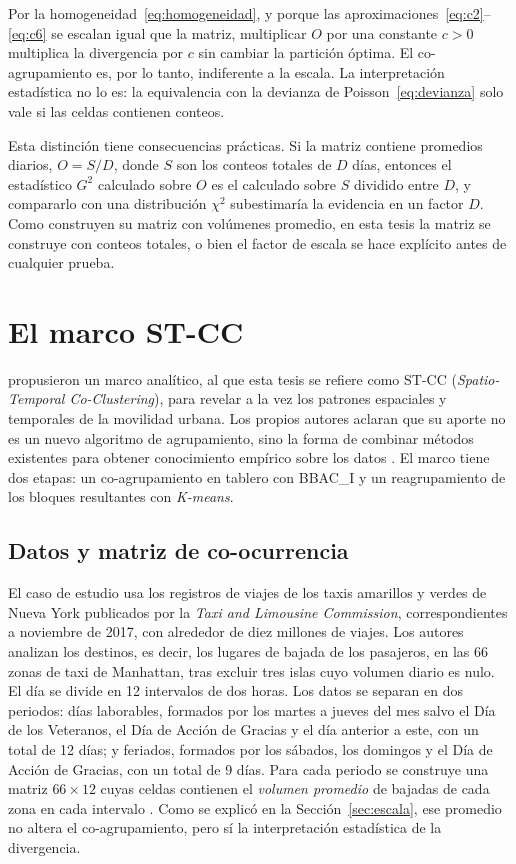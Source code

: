 Por la homogeneidad~\eqref{eq:homogeneidad}, y porque las
aproximaciones~\eqref{eq:c2}--\eqref{eq:c6} se escalan igual que la matriz,
multiplicar $O$ por una constante $c > 0$ multiplica la divergencia por $c$ sin
cambiar la partición óptima. El co-agrupamiento es, por lo tanto, indiferente a la
escala. La interpretación estadística no lo es: la equivalencia con la devianza
de Poisson~\eqref{eq:devianza} solo vale si las celdas contienen conteos.

Esta distinción tiene consecuencias prácticas. Si la matriz contiene promedios
diarios, $O = S / D$, donde $S$ son los conteos totales de $D$ días, entonces el
estadístico $G^2$ calculado sobre $O$ es el calculado sobre $S$ dividido entre
$D$, y compararlo con una distribución $\chi^2$ subestimaría la evidencia en un
factor $D$. Como \cite{Liu2021} construyen su matriz con volúmenes promedio, en
esta tesis la matriz se construye con conteos totales, o bien el factor de escala
se hace explícito antes de cualquier prueba.

\section{El marco ST-CC}\label{sec:stcc}

\cite{Liu2021} propusieron un marco analítico, al que esta tesis se refiere como
ST-CC (\emph{Spatio-Temporal Co-Clustering}), para revelar a la vez los patrones
espaciales y temporales de la movilidad urbana. Los propios autores aclaran que su
aporte no es un nuevo algoritmo de agrupamiento, sino la forma de combinar métodos
existentes para obtener conocimiento empírico sobre los datos
\cite[Sec.~I]{Liu2021}. El marco tiene dos etapas: un co-agrupamiento en tablero
con BBAC\_I y un reagrupamiento de los bloques resultantes con \textit{K-means}.

\subsection{Datos y matriz de co-ocurrencia}

El caso de estudio usa los registros de viajes de los taxis amarillos y verdes de
Nueva York publicados por la \emph{Taxi and Limousine Commission}, correspondientes
a noviembre de 2017, con alrededor de diez millones de viajes. Los autores
analizan los destinos, es decir, los lugares de bajada de los pasajeros, en las
66 zonas de taxi de Manhattan, tras excluir tres islas cuyo volumen diario es
nulo. El día se divide en 12 intervalos de dos horas. Los datos se separan en dos
periodos: días laborables, formados por los martes a jueves del mes salvo el Día
de los Veteranos, el Día de Acción de Gracias y el día anterior a este, con un
total de 12 días; y feriados, formados por los sábados, los domingos y el Día de
Acción de Gracias, con un total de 9 días. Para cada periodo se construye una
matriz $66 \times 12$ cuyas celdas contienen el \emph{volumen promedio} de bajadas
de cada zona en cada intervalo \cite[Sec.~IV.A]{Liu2021}. Como se explicó en la
Sección~\ref{sec:escala}, ese promedio no altera el co-agrupamiento, pero sí la
interpretación estadística de la divergencia.

